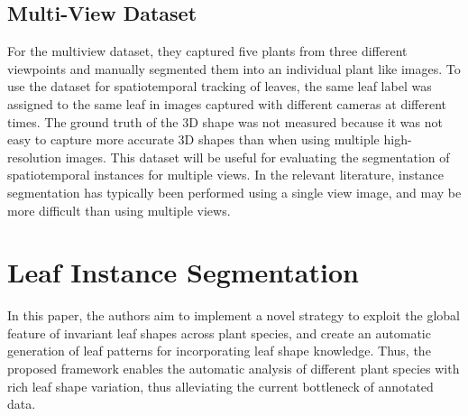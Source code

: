 \subsection{Multi-View Dataset}
For the multiview dataset, they captured five plants from three different viewpoints and manually segmented them into an individual plant
like images. To use the dataset for spatiotemporal tracking of leaves, the same leaf label was assigned to the same leaf in images
captured with different cameras at different times. The ground truth of the 3D shape was not measured because it was not easy to
capture more accurate 3D shapes than when using multiple high-resolution images. This dataset will be useful for evaluating the
segmentation of spatiotemporal instances for multiple views. In the relevant literature, instance segmentation has typically been
performed using a single view image, and may be more difficult than using multiple views.


\section{Leaf Instance Segmentation}
In this paper, the authors aim to implement a novel strategy to exploit the global feature of invariant leaf shapes across plant species,
and create an automatic generation of leaf patterns for incorporating leaf shape knowledge. Thus, the proposed framework enables the automatic
analysis of different plant species with rich leaf shape variation, thus alleviating the current bottleneck of annotated data.

